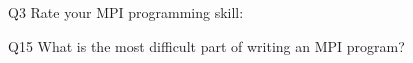 \begin{description}%
\item{Q3} Rate your MPI programming skill:%
\item{Q15} What is the most difficult part of writing an MPI program?%
\end{description}%
